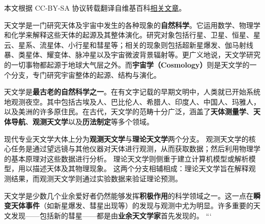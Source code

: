 
本文根据 CC-BY-SA 协议转载翻译自维基百科\href{https://en.wikipedia.org/wiki/Astronomy?utm_source=chatgpt.com}{相关文章}。

天文学是一门研究天体及宇宙中发生的各种现象的\textbf{自然科学}。它运用数学、物理学和化学来解释这些天体的起源及其整体演化。研究对象包括行星、卫星、恒星、星云、星系、流星体、小行星和彗星等；相关的现象则包括超新星爆发、伽马射线暴、类星体、耀变体、脉冲星以及宇宙微波背景辐射等。更广义地说，天文学研究的一切事物都起源于地球大气层之外。而\textbf{宇宙学（Cosmology）}则是天文学的一个分支，专门研究宇宙整体的起源、结构与演化。

天文学是\textbf{最古老的自然科学之一}。在有文字记载的早期文明中，人类就已开始系统地观测夜空。其中包括古埃及人、巴比伦人、希腊人、印度人、中国人、玛雅人，以及美洲的许多原住民。在古代，天文学的范畴十分广泛，涵盖了\textbf{天体测量学}、\textbf{天体导航}、\textbf{观测天文学}以及\textbf{历法制定}等多个领域。

现代专业天文学大体上分为\textbf{观测天文学}与\textbf{理论天文学}两个分支。  
观测天文学的核心任务是通过望远镜与其他仪器对天体进行观测，从而获取数据；然后利用物理学的基本原理对这些数据进行分析。  
理论天文学则侧重于建立计算机模型或解析模型，用以描述天体及其物理现象。  
这两个分支相辅相成：理论天文学旨在解释观测结果，而观测天文学则通过实验数据来验证理论预测。

天文学是少数几个业余爱好者仍然能够发挥\textbf{积极作用}的科学领域之一。这一点在\textbf{瞬变天体事件}（如新星爆发、彗星出现等）的发现与观测中尤为明显。许多重要的天文发现——包括新的彗星——都是由\textbf{业余天文学家}首先发现的。
```

